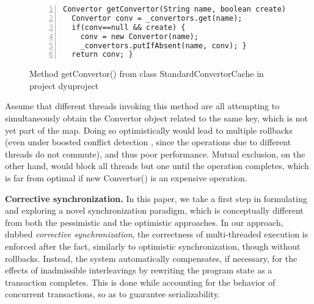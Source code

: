 
\begin{figure}
	\begin{lstlisting}[numbers=left]
Convertor getConvertor(String name, boolean create) {
  Convertor conv = _convertors.get(name);
  if(conv==null && create) {
    conv = new Convertor(name);
    _convertors.putIfAbsent(name, conv); }
  return conv; }
	\end{lstlisting}
	\caption{\label{Fi:introMotivating}Method {\sf getConvertor()} from class {\sf StandardConvertorCache} in project {\sf dyuproject}}
\end{figure}

Assume that different threads invoking this method are all attempting to simultaneously obtain the {\sf Convertor} object related to the same key, which is not yet part of the map. Doing so optimistically would lead to multiple rollbacks (even under boosted conflict detection \cite{ppopp08}, since the operations due to different threads do not commute), and thus poor performance. Mutual exclusion, on the other hand, would block all threads but one until the operation completes, which is far from optimal if {\sf new Convertor()} is an expensive operation.

\noindent \textbf{Corrective synchronization.} In this paper, we take a first step in formulating and exploring a novel synchronization paradigm, which is conceptually different from both the pessimistic and the optimistic approaches. In our approach, dubbed \emph{corrective synchronization}, the correctness of multi-threaded execution is enforced after the fact, similarly to optimistic synchronization, though without rollbacks. Instead, the system automatically compensates, if necessary, for the effects of inadmissible interleavings by rewriting the program state as a transaction completes. This is done while accounting for the behavior of concurrent transactions, so as to guarantee serializability.


